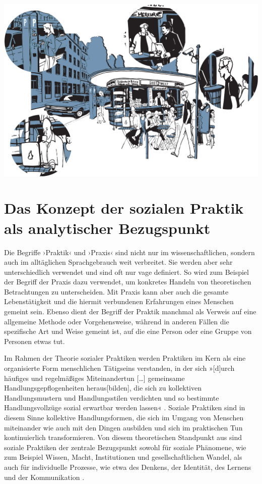 \documentclass[
  a4paper,
]{book}
\begin{document}
\begin{center}\includegraphics{Figures/04-01-Soziale-Praktiken} \end{center}

\section{Das Konzept der sozialen Praktik als analytischer Bezugspunkt}\label{das-konzept-der-sozialen-praktik-als-analytischer-bezugspunkt}

Die Begriffe ›Praktik‹ und ›Praxis‹ sind nicht nur im wissenschaftlichen, sondern auch im alltäglichen Sprachgebrauch weit verbreitet. Sie werden aber sehr unterschiedlich verwendet und sind oft nur vage definiert. So wird zum Beispiel der Begriff der Praxis dazu verwendet, um konkretes Handeln von theoretischen Betrachtungen zu unterscheiden. Mit Praxis kann aber auch die gesamte Lebenstätigkeit und die hiermit verbundenen Erfahrungen eines Menschen gemeint sein. Ebenso dient der Begriff der Praktik manchmal als Verweis auf eine allgemeine Methode oder Vorgehensweise, während in anderen Fällen die spezifische Art und Weise gemeint ist, auf die eine Person oder eine Gruppe von Personen etwas tut.

Im Rahmen der Theorie sozialer Praktiken werden Praktiken im Kern als eine organisierte Form menschlichen Tätigseins verstanden, in der sich »{[}d{]}urch häufiges und regelmäßiges Miteinandertun {[}\ldots{]} gemeinsame Handlungsgepflogenheiten heraus{[}bilden{]}, die sich zu kollektiven Handlungsmustern und Handlungsstilen verdichten und so bestimmte Handlungsvollzüge sozial erwartbar werden lassen« \citep{horningExpertenAlltags2001}. Soziale Praktiken sind in diesem Sinne kollektive Handlungsformen, die sich im Umgang von Menschen miteinander wie auch mit den Dingen ausbilden und sich im praktischen Tun kontinuierlich transformieren. Von diesem theoretischen Standpunkt aus sind soziale Praktiken der zentrale Bezugspunkt sowohl für soziale Phänomene, wie zum Beispiel Wissen, Macht, Institutionen und gesellschaftlichen Wandel, als auch für individuelle Prozesse, wie etwa des Denkens, der Identität, des Lernens und der Kommunikation \citep[vgl. z.B.][]{schatzkiPrimerPracticesTheory2012}.
\end{document}
